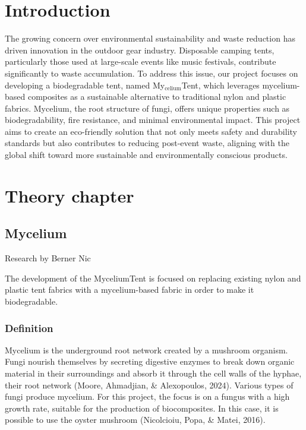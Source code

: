 \documentclass{article}
\begin{document}
\tableofcontents
\thispagestyle{empty}

\newpage
\section{Introduction}
The growing concern over environmental sustainability and waste reduction has driven
innovation in the outdoor gear industry. Disposable camping tents, particularly those used
at large-scale events like music festivals, contribute significantly to waste accumulation.
To address this issue, our project focuses on developing a biodegradable tent, named
My$_{\text{celium}}$Tent, which leverages mycelium-based composites as a sustainable
alternative to traditional nylon and plastic fabrics. Mycelium, the root structure of
fungi, offers unique properties such as biodegradability, fire resistance, and minimal
environmental impact. This project aims to create an eco-friendly solution that not only
meets safety and durability standards but also contributes to reducing post-event waste,
aligning with the global shift toward more sustainable and environmentally conscious
products.

\section{Theory chapter}
\subsection{Mycelium}
{\small Research by Berner Nic}

The development of the MyceliumTent is focused on replacing existing
nylon and plastic tent fabrics with a mycelium-based fabric in order
to make it biodegradable.

\subsubsection{Definition}
Mycelium is the underground root network created by a mushroom
organism. Fungi nourish themselves by secreting digestive enzymes to
break down organic material in their surroundings and absorb it
through the cell walls of the hyphae, their root network
(Moore, Ahmadjian, \& Alexopoulos, 2024). Various types of fungi
produce mycelium. For this project, the focus is on a fungus with a
high growth rate, suitable for the production of biocomposites. In
this case, it is possible to use the oyster mushroom
(Nicolcioiu, Popa, \& Matei, 2016).\\
\end{document}
